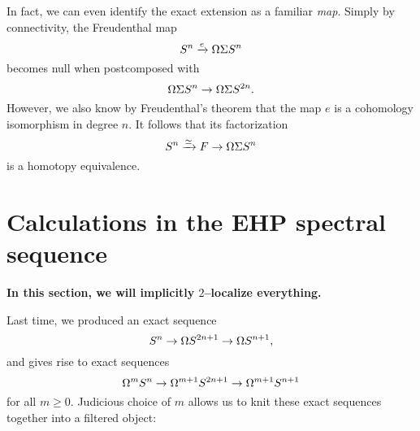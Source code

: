 \begin{remark}
In fact, we can even identify the exact extension as a familiar \emph{map}.
Simply by connectivity, the Freudenthal map \[S^n \xrightarrow e \Omega \Sigma S^n\] becomes null when postcomposed with \[\Omega \Sigma S^n \to \Omega \Sigma S^{2n}.\]
However, we also know by Freudenthal's theorem that the map $e$ is a cohomology isomorphism in degree $n$.
It follows that its factorization \[S^n \xrightarrow\simeq F \to \Omega \Sigma S^n\] is a homotopy equivalence.
\end{remark}




\section{Calculations in the EHP spectral sequence}

\begin{center}
\textbf{In this section, we will implicitly $2$--localize everything.}
\end{center}

Last time, we produced an exact sequence \[S^n \to \Omega S^{2n+1} \to \Omega S^{n+1},\] and  gives rise to exact sequences \[\Omega^m S^n \to \Omega^{m+1} S^{2n+1} \to \Omega^{m+1} S^{n+1}\] for all $m \ge 0$.
Judicious choice of $m$ allows us to knit these exact sequences together into a filtered object:

\begin{figure*}
\begin{center}
\end{center}
\end{figure*}

